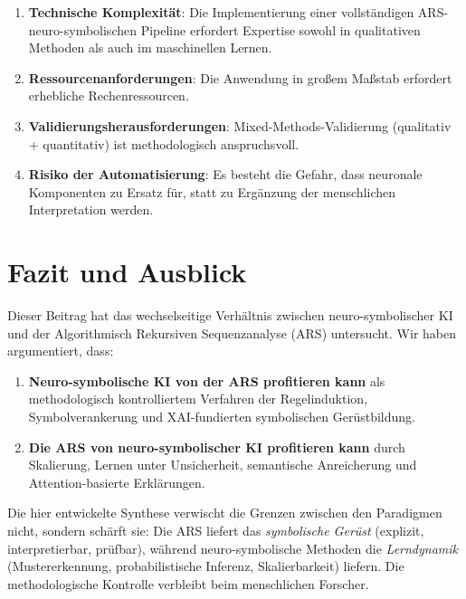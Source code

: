 \documentclass[12pt,a4paper]{article}
\begin{document}
\begin{enumerate}
    \item \textbf{Technische Komplexität}: Die Implementierung einer vollständigen 
    ARS-neuro-symbolischen Pipeline erfordert Expertise sowohl in qualitativen 
    Methoden als auch im maschinellen Lernen.
    
    \item \textbf{Ressourcenanforderungen}: Die Anwendung in großem Maßstab erfordert 
    erhebliche Rechenressourcen.
    
    \item \textbf{Validierungsherausforderungen}: Mixed-Methods-Validierung 
    (qualitativ + quantitativ) ist methodologisch anspruchsvoll.
    
    \item \textbf{Risiko der Automatisierung}: Es besteht die Gefahr, dass neuronale 
    Komponenten zu Ersatz für, statt zu Ergänzung der menschlichen Interpretation werden.
\end{enumerate}

\section{Fazit und Ausblick}

Dieser Beitrag hat das wechselseitige Verhältnis zwischen neuro-symbolischer KI 
und der Algorithmisch Rekursiven Sequenzanalyse (ARS) untersucht. Wir haben 
argumentiert, dass:

\begin{enumerate}
    \item \textbf{Neuro-symbolische KI von der ARS profitieren kann} als methodologisch 
    kontrolliertem Verfahren der Regelinduktion, Symbolverankerung und XAI-fundierten 
    symbolischen Gerüstbildung.
    
    \item \textbf{Die ARS von neuro-symbolischer KI profitieren kann} durch Skalierung, 
    Lernen unter Unsicherheit, semantische Anreicherung und Attention-basierte 
    Erklärungen.
\end{enumerate}

Die hier entwickelte Synthese verwischt die Grenzen zwischen den Paradigmen nicht, 
sondern schärft sie: Die ARS liefert das \textit{symbolische Gerüst} (explizit, 
interpretierbar, prüfbar), während neuro-symbolische Methoden die \textit{Lerndynamik} 
(Mustererkennung, probabilistische Inferenz, Skalierbarkeit) liefern. Die 
methodologische Kontrolle verbleibt beim menschlichen Forscher.
\end{document}
